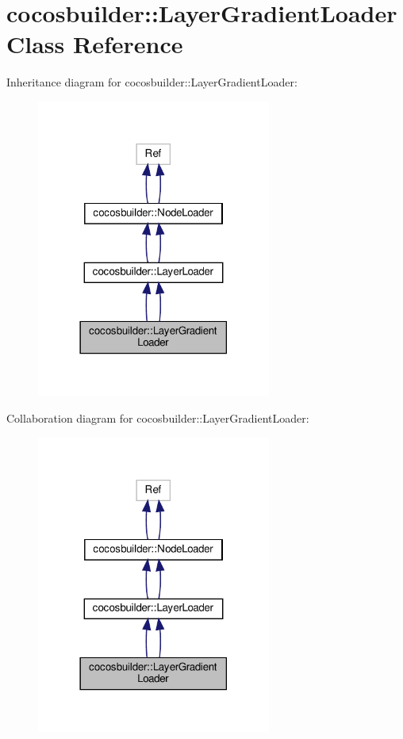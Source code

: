 \hypertarget{classcocosbuilder_1_1LayerGradientLoader}{}\section{cocosbuilder\+:\+:Layer\+Gradient\+Loader Class Reference}
\label{classcocosbuilder_1_1LayerGradientLoader}


Inheritance diagram for cocosbuilder\+:\+:Layer\+Gradient\+Loader\+:
\nopagebreak
\begin{figure}[H]
\begin{center}
\leavevmode
\includegraphics[width=218pt]{classcocosbuilder_1_1LayerGradientLoader__inherit__graph}
\end{center}
\end{figure}


Collaboration diagram for cocosbuilder\+:\+:Layer\+Gradient\+Loader\+:
\nopagebreak
\begin{figure}[H]
\begin{center}
\leavevmode
\includegraphics[width=218pt]{classcocosbuilder_1_1LayerGradientLoader__coll__graph}
\end{center}
\end{figure}
